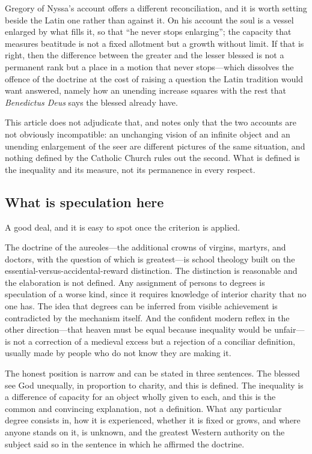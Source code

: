 Gregory of Nyssa's account offers a different reconciliation, and it is worth setting beside the Latin one rather than against it. On his account the soul is a vessel enlarged by what fills it, so that ``he never stops enlarging''; the capacity that measures beatitude is not a fixed allotment but a growth without limit. If that is right, then the difference between the greater and the lesser blessed is not a permanent rank but a place in a motion that never stops---which dissolves the offence of the doctrine at the cost of raising a question the Latin tradition would want answered, namely how an unending increase squares with the rest that \emph{Benedictus Deus} says the blessed already have.

This article does not adjudicate that, and notes only that the two accounts are not obviously incompatible: an unchanging vision of an infinite object and an unending enlargement of the seer are different pictures of the same situation, and nothing defined by the Catholic Church rules out the second. What is defined is the inequality and its measure, not its permanence in every respect.

\subsection{What is speculation here}

A good deal, and it is easy to spot once the criterion is applied.

The doctrine of the aureoles---the additional crowns of virgins, martyrs, and doctors, with the question of which is greatest---is school theology built on the essential-versus-accidental-reward distinction. The distinction is reasonable and the elaboration is not defined. Any assignment of persons to degrees is speculation of a worse kind, since it requires knowledge of interior charity that no one has. The idea that degrees can be inferred from visible achievement is contradicted by the mechanism itself. And the confident modern reflex in the other direction---that heaven must be equal because inequality would be unfair---is not a correction of a medieval excess but a rejection of a conciliar definition, usually made by people who do not know they are making it.

The honest position is narrow and can be stated in three sentences. The blessed see God unequally, in proportion to charity, and this is defined. The inequality is a difference of capacity for an object wholly given to each, and this is the common and convincing explanation, not a definition. What any particular degree consists in, how it is experienced, whether it is fixed or grows, and where anyone stands on it, is unknown, and the greatest Western authority on the subject said so in the sentence in which he affirmed the doctrine.
